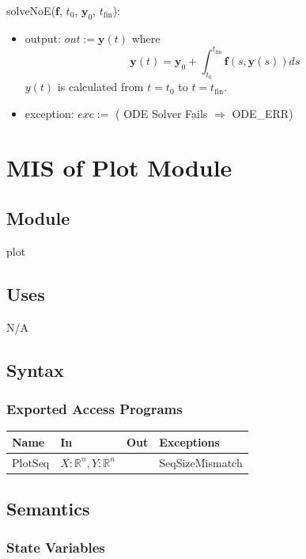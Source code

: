 \documentclass[12pt, titlepage]{article}
\begin{document}
solveNoE($\textbf{f}$, $t_0$, $\textbf{y}_0$, $t_\text{fin}$): 
\begin{itemize}
\item output: $out := \textbf{y}(t)$ where 
$$\textbf{y}(t) = \textbf{y}_0 + \int_{t_0}^{t_\text{fin}} \textbf{f}(s, \textbf{y}(s)) ds$$ 
$y(t)$ is calculated from $t = t_0$ to $t = t_\text{fin}$.
\item exception: $exc :=$ ( ODE Solver Fails $\Rightarrow$ ODE\_ERR)
\end{itemize}

\newpage

\section{MIS of Plot Module} \label{Plot}

\subsection{Module}

plot

\subsection{Uses}

N/A

\subsection{Syntax}

\subsubsection{Exported Access Programs}

\begin{center}
\begin{tabular}{p{2cm} p{8cm} p{2cm} p{2cm}}
\hline
\textbf{Name} & \textbf{In} & \textbf{Out} & \textbf{Exceptions} \\
\hline
PlotSeq & $X: \mathbb{R}^n, Y: \mathbb{R}^n$ & ~ & SeqSizeMismatch\\
\hline
\end{tabular}
\end{center}

\subsection{Semantics}

\subsubsection{State Variables}
\end{document}
